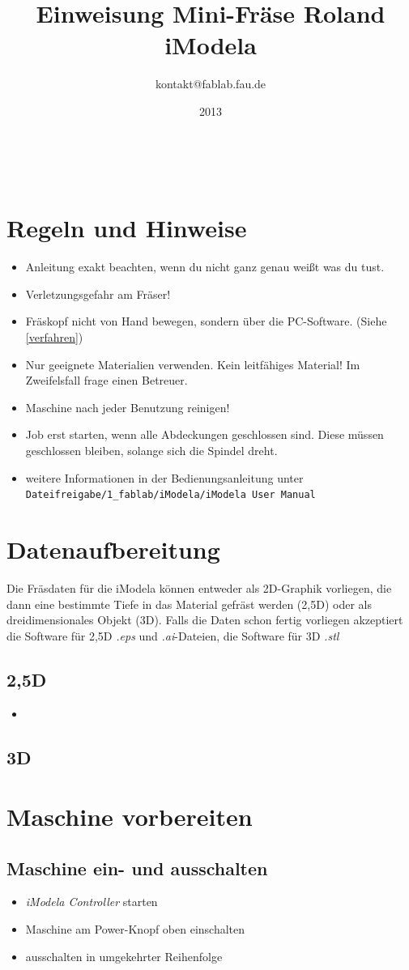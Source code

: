 \documentclass{\basedir/fablab-document}
\date{2013}
\author{kontakt@fablab.fau.de}
\title{Einweisung Mini-Fräse Roland iModela}
\newcommand{\todo}[1]{\textbf{\color{red}{TODO: #1}}}
\begin{document}
~
\section{Regeln und Hinweise}
\begin{itemize}
\item Anleitung exakt beachten, wenn du nicht ganz genau weißt was du
tust.
\item Verletzungsgefahr am Fräser!
\item Fräskopf nicht von Hand bewegen, sondern über die PC-Software. (Siehe \ref{verfahren})
\item Nur geeignete Materialien verwenden. Kein leitfähiges Material! Im Zweifelsfall frage einen Betreuer.
\item Maschine nach jeder Benutzung reinigen!
\item Job erst starten, wenn alle Abdeckungen geschlossen sind. Diese müssen geschlossen bleiben, solange sich die Spindel dreht.
\item weitere Informationen in der Bedienungsanleitung unter\\ \texttt{Dateifreigabe/1\_fablab/iModela/iModela User Manual}
\end{itemize}
\section{Datenaufbereitung}
Die Fräsdaten für die iModela können entweder als 2D-Graphik vorliegen, die dann eine bestimmte Tiefe in das Material gefräst werden (2,5D) oder als dreidimensionales Objekt (3D). Falls die Daten schon fertig vorliegen akzeptiert die Software für 2,5D \emph{.eps} und \emph{.ai}-Dateien, die Software für 3D \emph{.stl} \todo{...}
\subsection{2,5D}
\begin{itemize}
\item \todo{...}
\end{itemize}

\subsection{3D}
\todo{...}

\section{Maschine vorbereiten}
\subsection{Maschine ein- und ausschalten}
\begin{itemize}
	\item \emph{iModela Controller} starten \todo{Bild}
	\item Maschine am Power-Knopf oben einschalten \todo{Bild}
	\item ausschalten in umgekehrter Reihenfolge
\end{itemize}
\end{document}
